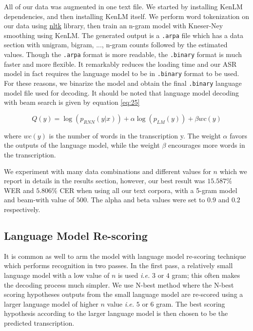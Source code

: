 All of our data was augmented in one text file. We started by installing KenLM dependencies, and then installing KenLM itself. We perform word tokenization on our data using \href{https://www.nltk.org/}{nltk} library, then train an n-gram model with Kneser-Ney smoothing using KenLM. The generated output is a \texttt{.arpa} file which has a data section with unigram, bigram, ..., n-gram counts followed by the estimated values. Though the \texttt{.arpa} format is more readable, the \texttt{.binary} format is much faster and more flexible. It remarkably reduces the loading time and our \ac{ASR} model in fact requires the language model to be in \texttt{.binary} format to be used. For these reasons, we binarize the model and obtain the final \texttt{.binary} language model file used for decoding. It should be noted that language model decoding with beam search is given by equation \ref{eq:25}

\begin{equation}
Q(y) = \log(p_{RNN}(y|x)) + \alpha \log(p_{LM}(y)) + \beta wc(y)
\end{equation}

where $wc(y)$ is the number of words in the transcription y. The weight $\alpha$ favors the outputs of the language model, while the weight $\beta$ encourages more words in the transcription.

We experiment with many data combinations and different values for $n$ which we report in details in the results section, however, our best result was $15.587\%$ \ac{WER} and $5.806\%$ \ac{CER} when using all our text corpora, with a 5-gram model and beam-with value of $500$. The alpha and beta values were set to $0.9$ and $0.2$ respectively.

\subsection{Language Model Re-scoring}
\label{meth:s4_sub6}

It is common as well to arm the model with language model re-scoring technique which performs recognition in two passes. In the first pass, a relatively small language model with a low value of $n$ is used \textit{i.e.} $3$ or $4$ gram; this often makes the decoding process much simpler. We use N-best method where the N-best scoring hypotheses outputs from the small language model are re-scored using a larger language model of higher $n$ value \textit{i.e.} $5$ or $6$ gram. The best scoring hypothesis according to the larger language model is then chosen to be the predicted transcription.


